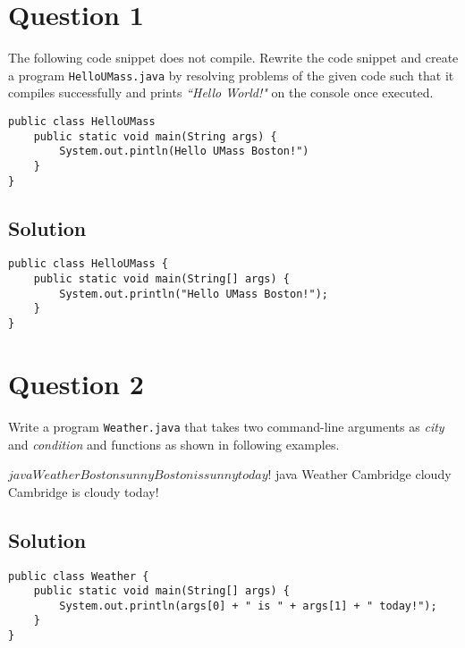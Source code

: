 \documentclass[12pt,letterpaper,twoside]{article}
\begin{document}


\section*{Question 1}

The following code snippet does not compile. Rewrite the code snippet and create a program \texttt{HelloUMass.java} by resolving problems of the given code such that it compiles successfully and prints \textit{``Hello World!"} on the console once executed.

\lstset{language=Java}
\begin{lstlisting}
public class HelloUMass
	public static void main(String args) {
		System.out.pintln(Hello UMass Boston!")
	}
}
\end{lstlisting}

\subsection*{Solution}

\lstset{language=Java,tabsize=2}
\begin{lstlisting}
public class HelloUMass {
	public static void main(String[] args) {
		System.out.println("Hello UMass Boston!");
	}
}
\end{lstlisting}

\section*{Question 2}

Write a program \texttt{Weather.java} that takes two command-line arguments as \textit{city} and \textit{condition} and functions as shown in following examples.

\begin{terminal}
$ java Weather Boston sunny
Boston is sunny today!
$ java Weather Cambridge cloudy
Cambridge is cloudy today!
\end{terminal}

\subsection*{Solution}

\lstset{language=Java,tabsize=2}
\begin{lstlisting}
public class Weather {
	public static void main(String[] args) {
		System.out.println(args[0] + " is " + args[1] + " today!");
	}
}
\end{lstlisting}
\end{document}
